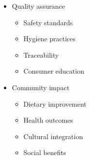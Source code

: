 \begin{itemize}
\begin{itemize}
        \item Quality assurance
        \begin{itemize}
            \item Safety standards
            \item Hygiene practices
            \item Traceability
            \item Consumer education
        \end{itemize}
        
        \item Community impact
        \begin{itemize}
            \item Dietary improvement
            \item Health outcomes
            \item Cultural integration
            \item Social benefits
        \end{itemize}
    \end{itemize}
\end{itemize}

